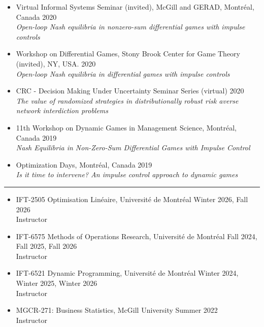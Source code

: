 \documentclass[12pt]{article}
\renewcommand{\section}[1]{
\vspace{0.25em}
\noindent{\normalfont\large\bfseries\color{black} #1}\par
\vspace{-0.24em}
\noindent\textcolor{black}{\rule{0.55\textwidth}{1.1pt}}
\vspace{0.48em}
}
\newenvironment{lonemidlist}[1][\enskip\textbullet]%
        {\begin{itemize}[#1,leftmargin=*,parsep=0pt,itemsep=5pt,topsep=2pt,partopsep=0pt]}
        {\end{itemize}\vspace{-.6\baselineskip}}
\begin{document}
\begin{lonemidlist}
\item Virtual Informal Systems Seminar (invited), McGill and GERAD, Montréal, Canada \hfill{2020}\\
\textit{Open-loop Nash equilibria in nonzero-sum differential games with impulse controls}
\item Workshop on Differential Games, Stony Brook Center for Game Theory (invited), NY, USA. \hfill{2020}\\
\textit{Open-loop Nash equilibria in differential games with impulse controls}
\item  CRC - Decision Making Under Uncertainty Seminar Series (virtual) \hfill{2020}\\
\textit{The value of randomized strategies in distributionally robust risk averse network interdiction problems}
\item  11th Workshop on Dynamic Games in Management Science, Montr\'eal, Canada \hfill{2019}\\
\textit{Nash Equilibria in Non-Zero-Sum Differential Games with Impulse Control}
\item Optimization Days, Montr\'eal, Canada \hfill{2019}\\
\textit{Is it time to intervene? An impulse control approach to dynamic games}\\
\end{lonemidlist}

\vspace{1mm}
\section{Courses Taught}
\vspace{-3mm}
\begin{lonemidlist}
\item IFT-2505 Optimisation Linéaire, Université de Montréal \hfill{Winter 2026, Fall 2026}\\
Instructor
\item IFT-6575 Methods of Operations Research, Université de Montréal \hfill{Fall 2024, Fall 2025, Fall 2026}\\
Instructor
\item IFT-6521 Dynamic Programming, Université de Montréal \hfill{Winter 2024, Winter 2025, Winter 2026}\\
Instructor
\item MGCR-271: Business Statistics, McGill University \hfill{Summer 2022}\\
Instructor\\
\end{lonemidlist}
\end{document}
